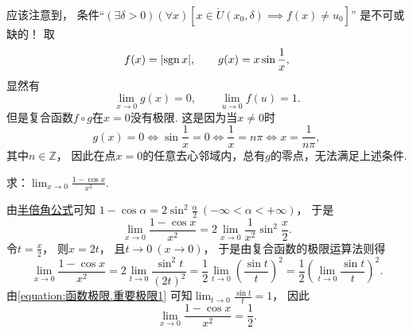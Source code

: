 \begin{remark}
应该注意到，
条件“\((\exists\delta>0)(\forall x)[x\in\mathring{U}(x_0,\delta) \implies f(x)\neq u_0]\)”
是不可或缺的！
取\begin{equation*}
	f(x) = \abs{\operatorname{sgn} x}, \qquad
	g(x) = x \sin\frac1x,
\end{equation*}
显然有\begin{equation*}
	\lim_{x\to0} g(x) = 0, \qquad
	\lim_{u\to0} f(u) = 1.
\end{equation*}
但是复合函数\(f \circ g\)在\(x=0\)没有极限.
这是因为当\(x\neq0\)时\begin{equation*}
	g(x) = 0
	\iff
	\sin\frac1x = 0
	\iff
	\frac1x = n\pi
	\iff
	x = \frac1{n\pi},
\end{equation*}
其中\(n\in\mathbb{Z}\)，
因此在点\(x=0\)的任意去心邻域内，总有\(g\)的零点，无法满足上述条件.
\end{remark}

\begin{example}
求：\(\lim_{x\to0} \frac{1-\cos x}{x^2}\).
\begin{solution}
由\hyperref[equation:三角函数.正弦的半倍角公式]{半倍角公式}可知
\(1 - \cos\alpha = 2\sin^2\frac\alpha2\ (-\infty<\alpha<+\infty)\)，
于是\begin{equation*}
	\lim_{x\to0} \frac{1-\cos x}{x^2}
	= 2 \lim_{x\to0} \frac1{x^2} \sin^2\frac{x}2.
\end{equation*}
令\(t=\frac{x}2\)，
则\(x=2t\)，
且\(t\to0\ (x\to0)\)，
于是由复合函数的极限运算法则得\begin{equation*}
	\lim_{x\to0} \frac{1-\cos x}{x^2}
	= 2 \lim_{t\to0} \frac{\sin^2 t}{(2t)^2}
	= \frac12 \lim_{t\to0} \left(\frac{\sin t}{t}\right)^2
	= \frac12 \left(\lim_{t\to0} \frac{\sin t}{t}\right)^2.
\end{equation*}
由\cref{equation:函数极限.重要极限1} 可知\(\lim_{t\to0} \frac{\sin t}{t} = 1\)，
因此\begin{equation}\label{equation:函数极限.重要极限8}
	\lim_{x\to0} \frac{1-\cos x}{x^2} = \frac12.
\end{equation}
\end{solution}
\end{example}

